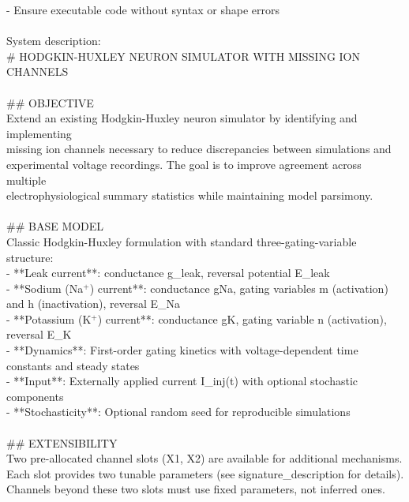 \begin{tcolorbox}
        - Ensure executable code without syntax or shape errors\\{}
        \\{}
        System description:\\{}
        \# HODGKIN-HUXLEY NEURON SIMULATOR WITH MISSING ION CHANNELS\\{}
        \\{}
        \#\# OBJECTIVE\\{}
        Extend an existing Hodgkin-Huxley neuron simulator by identifying and implementing\\{}
        missing ion channels necessary to reduce discrepancies between simulations and\\{}
        experimental voltage recordings. The goal is to improve agreement across multiple\\{}
        electrophysiological summary statistics while maintaining model parsimony.\\{}
        \\{}
        \#\# BASE MODEL\\{}
        Classic Hodgkin-Huxley formulation with standard three-gating-variable structure:\\{}
        - **Leak current**: conductance g\_leak, reversal potential E\_leak\\{}
        - **Sodium (Na$^{+}$) current**: conductance gNa, gating variables m (activation) and h (inactivation), reversal E\_Na\\{}
        - **Potassium (K$^{+}$) current**: conductance gK, gating variable n (activation), reversal E\_K\\{}
        - **Dynamics**: First-order gating kinetics with voltage-dependent time constants and steady states\\{}
        - **Input**: Externally applied current I\_inj(t) with optional stochastic components\\{}
        - **Stochasticity**: Optional random seed for reproducible simulations\\{}
        \\{}
        \#\# EXTENSIBILITY\\{}
        Two pre-allocated channel slots (X1, X2) are available for additional mechanisms.\\{}
        Each slot provides two tunable parameters (see signature\_description for details).\\{}
        Channels beyond these two slots must use fixed parameters, not inferred ones.\\{}

\end{tcolorbox}
